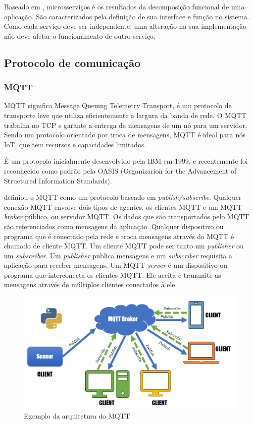 Baseado em \cite{Pahl}, microsserviços é os resultados da decomposição funcional de uma aplicação. São caracterizados pela definição de sua interface e função no sistema. Como cada serviço deve ser independente, uma alteração na sua implementação não deve afetar o funcionamento de outro serviço.

\subsection{Protocolo de comunicação}

\subsubsection{MQTT}

MQTT significa Message Queuing Telemetry Transport, é um protocolo de transporte leve que utiliza eficientemente a largura da banda de rede.\cite{mqtt1} O MQTT trabalha no TCP e garante a entrega de mensagens de um nó para um servidor. Sendo um protocolo orientado por troca de mensagens, MQTT é ideal para nós IoT, que tem recursos e capacidades limitados.

É um protocolo inicialmente desenvolvido pela IBM \cite{mqtt-ibm} em 1999, e recentemente foi reconhecido como padrão pela OASIS (Organizarion for the Advancement of Structured Information Standards).\cite{mqtt-oasis}

\cite{Kodali2017} definiou o MQTT como um protocolo baseado em \textit {publish/subscribe}. Qualquer conexão MQTT envolve dois tipos de agentes, os clientes MQTT e um MQTT \textit {broker} público, ou servidor MQTT. Os dados que são transportados pelo MQTT são referenciados como mensagens da aplicação. Qualquer dispositivo ou programa que é conectado pela rede e troca mensagens através do MQTT é chamado de cliente MQTT. Um cliente MQTT pode ser tanto um \textit {publisher} ou um \textit {subscriber}. Um \textit {publisher} publica mensagens e um \textit {subscriber} requisita a aplicação para receber mensagens. Um MQTT \textit {server} é um dispositivo ou programa que interconecta os clientes MQTT. Ele aceita e transmite as mensagens através de múltiplos clientes conectados à ele.

\begin{figure}[htbp]
	\centering
	\includegraphics[width=1\linewidth]{figuras/mqtt-architecture.png}
	\caption{Exemplo da arquitetura do MQTT}
	\label{fig:arquitetura-mqtt}
\end{figure}

